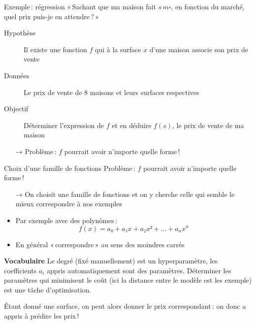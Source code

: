 \documentclass[../allslides.tex]{subfiles}
\begin{document}
\begin{frame}{Exemple : régression}
    « Sachant que ma maison fait \(s\,\si{m\square}\), en fonction du marché, quel prix puis-je en attendre ? »
    \begin{description}
        \item[Hypothèse] Il existe une fonction \(f\) qui à la surface \(x\) d'une maison associe son prix de vente
        \item[Données] Le prix de vente de \num{8} maisons et leurs surfaces respectives
        \item[Objectif] Déterminer l'expression de \(f\) et en déduire \(f(s)\), le prix de vente de ma maison
    \end{description}
    \begin{itemize}
        \item[→] Problème : \(f\) pourrait avoir n'importe quelle forme !
    \end{itemize}
\end{frame}

\begin{frame}{Choix d'une famille de fonctions}
    Problème : \(f\) pourrait avoir n'importe quelle forme !
    \begin{itemize}
        \item[→] On choisit une famille de fonctions et on y cherche celle qui semble le mieux correspondre à nos exemples
        \item Par exemple avec des polynômes :
            \begin{equation}
                f(x) = a₀ + a₁x + a₂x²+ … + a_nx^n
            \end{equation}
        \item En général « correspondre » au sens des moindres carrés
    \end{itemize}
    \textbf{Vocabulaire} Le degré (fixé manuellement) est un \alert{hyperparamètre}, les coefficients \(a_i\) appris automatiquement sont des \alert{paramètres}.
    Déterminer les paramètres qui minimisent le coût (ici la distance entre le modèle est les exemple) est une tâche d'\alert{optimisation}.

    Étant donné une surface, on peut alors donner le prix correspondant : on donc a appris à prédire les prix !
\end{frame}
\end{document}
